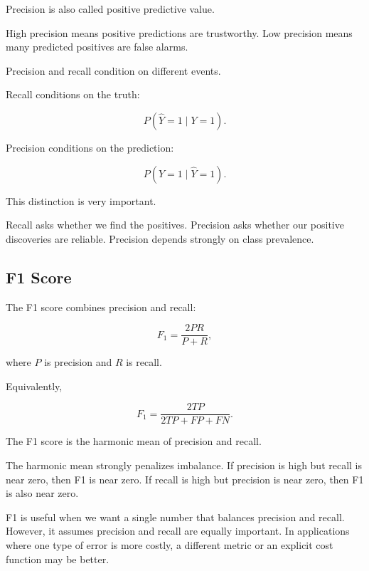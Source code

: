 \documentclass[
  letterpaper,
  DIV=11,
  numbers=noendperiod]{scrreprt}
\theoremstyle{definition}
\theoremstyle{definition}
\theoremstyle{plain}
\theoremstyle{plain}
\theoremstyle{remark}
\begin{document}
Precision is also called positive predictive value.

High precision means positive predictions are trustworthy. Low precision
means many predicted positives are false alarms.

\begin{tcolorbox}[enhanced jigsaw, arc=.35mm, bottomrule=.15mm, bottomtitle=1mm, breakable, colback=white, colbacktitle=quarto-callout-note-color!10!white, colframe=quarto-callout-note-color-frame, coltitle=black, left=2mm, leftrule=.75mm, opacityback=0, opacitybacktitle=0.6, rightrule=.15mm, title=\textcolor{quarto-callout-note-color}{\faInfo}\hspace{0.5em}{Precision vs Recall}, titlerule=0mm, toprule=.15mm, toptitle=1mm]

Precision and recall condition on different events.

Recall conditions on the truth:

\[
P(\hat Y=1\mid Y=1).
\]

Precision conditions on the prediction:

\[
P(Y=1\mid \hat Y=1).
\]

This distinction is very important.

Recall asks whether we find the positives. Precision asks whether our
positive discoveries are reliable. Precision depends strongly on class
prevalence.

\end{tcolorbox}

\subsection{F1 Score}\label{f1-score}

The F1 score combines precision and recall:

\[
F_1
=
\frac{2PR}{P+R},
\]

where \(P\) is precision and \(R\) is recall.

Equivalently,

\[
F_1
=
\frac{2TP}{2TP+FP+FN}.
\]

The F1 score is the harmonic mean of precision and recall.

The harmonic mean strongly penalizes imbalance. If precision is high but
recall is near zero, then F1 is near zero. If recall is high but
precision is near zero, then F1 is also near zero.

F1 is useful when we want a single number that balances precision and
recall. However, it assumes precision and recall are equally important.
In applications where one type of error is more costly, a different
metric or an explicit cost function may be better.
\end{document}
